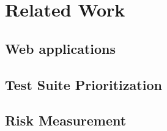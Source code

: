 \section{Related Work}
\label{sec:related-work}

\subsection{Web applications}

\subsection{Test Suite Prioritization}

\subsection{Risk Measurement}



